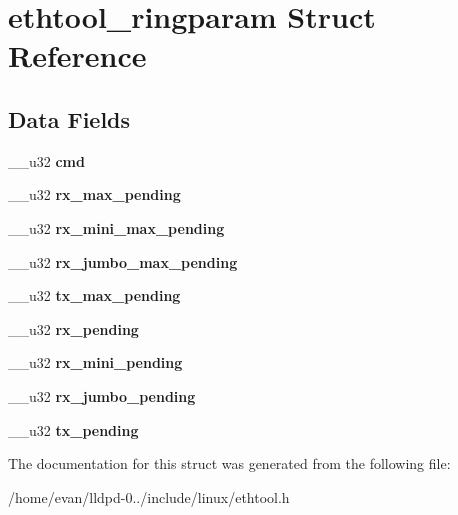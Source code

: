 \section{ethtool\-\_\-ringparam \-Struct \-Reference}
\label{structethtool__ringparam}
\subsection*{\-Data \-Fields}
\begin{DoxyCompactItemize}
\item 
\-\_\-\-\_\-u32 {\bfseries cmd}\label{structethtool__ringparam_a66d231264d5aa36fd7d347e2c967769a}

\item 
\-\_\-\-\_\-u32 {\bfseries rx\-\_\-max\-\_\-pending}\label{structethtool__ringparam_a32fc16e400fafc5caaa241314d5e478f}

\item 
\-\_\-\-\_\-u32 {\bfseries rx\-\_\-mini\-\_\-max\-\_\-pending}\label{structethtool__ringparam_a98143a9e24db15f6834f4ed9437ac57c}

\item 
\-\_\-\-\_\-u32 {\bfseries rx\-\_\-jumbo\-\_\-max\-\_\-pending}\label{structethtool__ringparam_ae31b23dfd7e4a127e1ec5d78b0cd7141}

\item 
\-\_\-\-\_\-u32 {\bfseries tx\-\_\-max\-\_\-pending}\label{structethtool__ringparam_a0406abb8544c5a76711c202371611fc4}

\item 
\-\_\-\-\_\-u32 {\bfseries rx\-\_\-pending}\label{structethtool__ringparam_a25be29dbb055503fe0371538bc3a237b}

\item 
\-\_\-\-\_\-u32 {\bfseries rx\-\_\-mini\-\_\-pending}\label{structethtool__ringparam_ac54ec801b717788f637ccccbc0253e37}

\item 
\-\_\-\-\_\-u32 {\bfseries rx\-\_\-jumbo\-\_\-pending}\label{structethtool__ringparam_a0ec9f9bc408b48e338fa66e491127dab}

\item 
\-\_\-\-\_\-u32 {\bfseries tx\-\_\-pending}\label{structethtool__ringparam_a5d8cfcb48a10e8a1b1ea3e2103a803b3}

\end{DoxyCompactItemize}


\-The documentation for this struct was generated from the following file\-:\begin{DoxyCompactItemize}
\item 
/home/evan/lldpd-\/0../include/linux/ethtool.\-h\end{DoxyCompactItemize}
